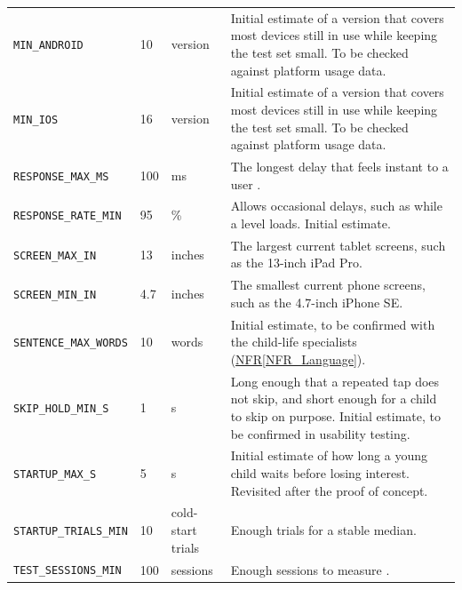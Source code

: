 \documentclass[10pt]{article}
\newcommand{\nfrref}[1]{\hyperref[#1]{NFR\ref*{#1}}}
\newcommand{\constref}[1]{%
    \hyperref[const:#1]{\texttt{\detokenize{#1}}}%
}
\begin{document}
\begin{longtable}{>{\raggedright\arraybackslash}p{} p{} >{\raggedright\arraybackslash}p{} >{\raggedright\arraybackslash}p{}}
\texttt{MIN\_ANDROID}
\label{const:MIN_ANDROID}
& 10 & version & Initial estimate of a version that covers most devices still in use while keeping the test set small. To be checked against platform usage data. \\

\texttt{MIN\_IOS}
\label{const:MIN_IOS}
& 16 & version & Initial estimate of a version that covers most devices still in use while keeping the test set small. To be checked against platform usage data. \\

\texttt{RESPONSE\_MAX\_MS}
\label{const:RESPONSE_MAX_MS}
& 100 & ms & The longest delay that feels instant to a user \cite{Nielsen1993}. \\

\texttt{RESPONSE\_RATE\_MIN}
\label{const:RESPONSE_RATE_MIN}
& 95 & \% & Allows occasional delays, such as while a level loads. Initial estimate. \\

\texttt{SCREEN\_MAX\_IN}
\label{const:SCREEN_MAX_IN}
& 13 & inches & The largest current tablet screens, such as the 13-inch iPad Pro. \\

\texttt{SCREEN\_MIN\_IN}
\label{const:SCREEN_MIN_IN}
& 4.7 & inches & The smallest current phone screens, such as the 4.7-inch iPhone SE. \\

\texttt{SENTENCE\_MAX\_WORDS}
\label{const:SENTENCE_MAX_WORDS}
& 10 & words & Initial estimate, to be confirmed with the child-life specialists (\nfrref{NFR_Language}). \\

\texttt{SKIP\_HOLD\_MIN\_S}
\label{const:SKIP_HOLD_MIN_S}
& 1 & s & Long enough that a repeated tap does not skip, and short enough for a child to skip on purpose. Initial estimate, to be confirmed in usability testing. \\

\texttt{STARTUP\_MAX\_S}
\label{const:STARTUP_MAX_S}
& 5 & s & Initial estimate of how long a young child waits before losing interest. Revisited after the proof of concept. \\

\texttt{STARTUP\_TRIALS\_MIN}
\label{const:STARTUP_TRIALS_MIN}
& 10 & cold-start trials & Enough trials for a stable median. \\

\texttt{TEST\_SESSIONS\_MIN}
\label{const:TEST_SESSIONS_MIN}
& 100 & sessions & Enough sessions to measure \constref{CRASH_FREE_RATE_MIN}. \\


\end{longtable}
\end{document}
